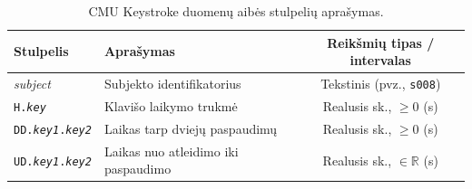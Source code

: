 \begin{table}[H]
    \centering
    \caption{CMU Keystroke duomenų aibės stulpelių aprašymas.}
    \begin{tabular}{|l|l|c|}
        \hline
        Stulpelis & Aprašymas & Reikšmių tipas / intervalas \\
        \hline
        \textit{subject} & Subjekto identifikatorius & Tekstinis (pvz., \texttt{s008}) \\ \hline
        \texttt{H.\textit{key}} & Klavišo laikymo trukmė & Realusis sk., $\geq 0$ (s) \\ \hline
        \texttt{DD.\textit{key1}.\textit{key2}} & Laikas tarp dviejų paspaudimų & Realusis sk., $\geq 0$ (s) \\ \hline
        \texttt{UD.\textit{key1}.\textit{key2}} & Laikas nuo atleidimo iki paspaudimo & Realusis sk., $\in \mathbb{R}$ (s) \\ \hline
    \end{tabular}
    \label{tab:keystroke_stulpeliu_aprasymas}
\end{table}